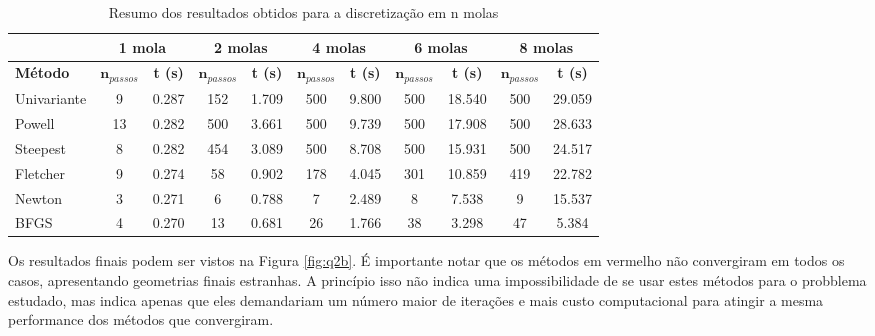 \documentclass[10pt, a4paper]{article}
\begin{document}
\begin{table}[htpb]
  \centering
  \begin{tabular}{|l|c|c|c|c|c|c|c|c|c|c|}
    \multicolumn{1}{c}{}
    &
    \multicolumn{2}{c}{1 mola} \vline
    &
    \multicolumn{2}{c}{2 molas} \vline
    &
    \multicolumn{2}{c}{4 molas} \vline
    &
    \multicolumn{2}{c}{6 molas} \vline
    &
    \multicolumn{2}{c}{8 molas}
    \\
    \hline%
    \textbf{Método}
    &
    $\mathbf{n}_{passos}$
    & 
    \textbf{t (s)}
    &
    $\mathbf{n}_{passos}$
    & 
    \textbf{t (s)}
    &
    $\mathbf{n}_{passos}$
    & 
    \textbf{t (s)}
    &
    $\mathbf{n}_{passos}$
    & 
    \textbf{t (s)}
    &
    $\mathbf{n}_{passos}$
    & 
    \textbf{t (s)}
    \\
    Univariante        &  9 &  0.287  &  152 & 1.709 & {\color{red} 500} & 9.800 & {\color{red} 500} & 18.540 & {\color{red} 500} & 29.059 \\
    Powell             & 13 &  0.282  &  {\color{red} 500} & 3.661 & {\color{red} 500} & 9.739 & {\color{red} 500} & 17.908 & {\color{red} 500} & 28.633 \\
    Steepest           &  8 &  0.282  &  454 & 3.089 & {\color{red} 500} & 8.708 & {\color{red} 500} & 15.931 & {\color{red} 500} & 24.517 \\
    Fletcher           &  9 &  0.274  &   58 & 0.902 & 178 & 4.045 & 301 & 10.859 & 419 & 22.782 \\
    Newton             &  3 &  0.271  &    6 & 0.788 &   7 & 2.489 &   8 &  7.538 &   9 & 15.537 \\
    BFGS               &  4 &  0.270  &   13 & 0.681 &  26 & 1.766 &  38 &  3.298 &  47 &  5.384 \\
    \hline
  \end{tabular}
  \caption{Resumo dos resultados obtidos para a discretização em n molas}
  \label{tab:q2b_results}
\end{table}

Os resultados finais podem ser vistos na Figura \ref{fig:q2b}. É importante notar que os métodos em vermelho não convergiram em
todos os casos, apresentando geometrias finais estranhas. A princípio isso não indica uma impossibilidade de se usar estes métodos
para o probblema estudado, mas indica apenas que eles demandariam um número maior de iterações e mais custo computacional para atingir
a mesma performance dos métodos que convergiram.
\end{document}
